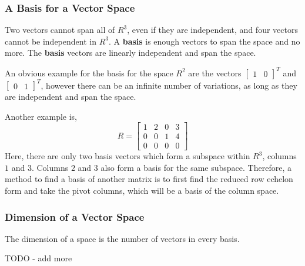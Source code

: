         \subsubsection{A Basis for a Vector Space}
            Two vectors cannot span all of \(R^3\), even if they are independent, and four vectors cannot be 
            independent in \(R^3\). A \textbf{basis} is enough vectors to span the space and no more. The
            \textbf{basis} vectors are linearly independent and span the space.

            \par \hfill \break
            An obvious example for the basis for the space \(R^2\) are the vectors \(\begin{bmatrix} 1 & 0 
            \end{bmatrix}^T\) and \(\begin{bmatrix} 0 & 1 \end{bmatrix}^T\), however there can be an infinite number 
            of variations, as long as they are independent and span the space.
            
            \par \hfill \break
            Another example is,
            \begin{equation}
                R = 
                \begin{bmatrix}
                    1 & 2 & 0 & 3 \\
                    0 & 0 & 1 & 4 \\
                    0 & 0 & 0 & 0
                \end{bmatrix}
            \end{equation}
            Here, there are only two basis vectors which form a subspace within \(R^3\), columns \(1\) and \(3\). 
            Columns \(2\) and \(3\) also form a basis for the same subspace. Therefore, a method to find a basis of 
            another matrix is to first find the reduced row echelon form and take the pivot columns, which will be a 
            basis of the column space.

        \subsubsection{Dimension of a Vector Space}
            The dimension of a space is the number of vectors in every basis.

            \par \hfill \break
            TODO - add more

